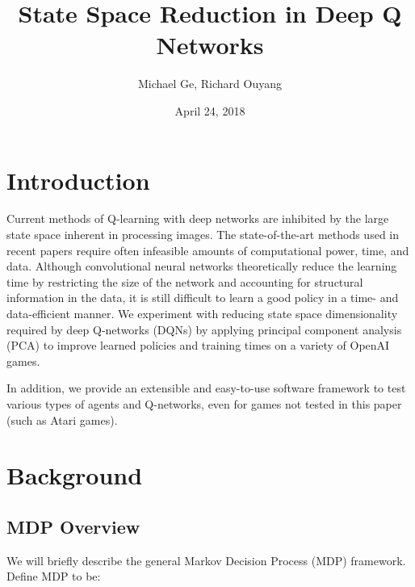 \documentclass[11pt, twocolumn]{article}
\title{State Space Reduction in Deep Q Networks}
\author{Michael Ge, Richard Ouyang}
\date{April 24, 2018}
\begin{document}
\maketitle

\section{Introduction}

Current methods of Q-learning with deep networks are inhibited by the
large state space inherent in processing images. The state-of-the-art
methods used in recent papers \cite{mnih2013playing, mnih2015human, van2016deep} require often infeasible
amounts of computational power, time, and data. Although convolutional
neural networks theoretically reduce the learning time by restricting
the size of the network and accounting for structural information in
the data, it is still difficult to learn a good policy in a time- and
data-efficient manner. We experiment with reducing state space
dimensionality required by deep Q-networks (DQNs) by applying
principal component analysis (PCA) to improve learned policies and
training times on a variety of OpenAI games.

In addition, we provide an extensible and easy-to-use software
framework to test various types of agents and Q-networks, even for
games not tested in this paper (such as Atari games).

\section{Background}

\subsection{MDP Overview}

We will briefly describe the general Markov Decision Process (MDP)
framework. Define MDP to be:
\end{document}
